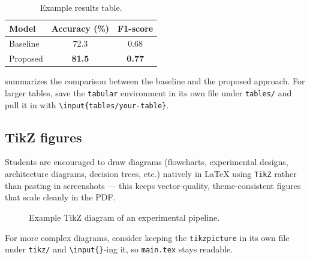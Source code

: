 \documentclass[11pt, a4paper]{article}
\begin{document}
\begin{table}[H]
    \centering
    \caption{Example results table.}
    \label{T:example}
    \begin{tabular}{lcc}
        \toprule
        Model & Accuracy (\%) & F1-score \\
        \midrule
        Baseline     & 72.3 & 0.68 \\
        Proposed     & \textbf{81.5} & \textbf{0.77} \\
        \bottomrule
    \end{tabular}
\end{table}

 summarizes the comparison between the baseline and the proposed approach. For larger tables, save the \texttt{tabular} environment in its own file under \texttt{tables/} and pull it in with \texttt{\textbackslash input\{tables/your-table\}}.

\subsection{TikZ figures}
Students are encouraged to draw diagrams (flowcharts, experimental designs, architecture diagrams, decision trees, etc.) natively in \LaTeX{} using \texttt{TikZ} rather than pasting in screenshots — this keeps vector-quality, theme-consistent figures that scale cleanly in the PDF.

\begin{figure}[H]
    \centering
    \caption{Example TikZ diagram of an experimental pipeline.}
    \label{F:tikz-example}
\end{figure}

For more complex diagrams, consider keeping the \texttt{tikzpicture} in its own file under \texttt{tikz/} and \texttt{\textbackslash input\{\}}-ing it, so \texttt{main.tex} stays readable.
\end{document}
